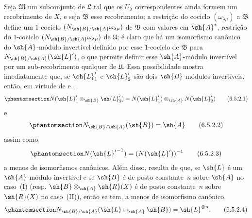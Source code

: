 \documentclass[oneside,10pt]{amsart}
\let\EGAOriginalLabel\label
\renewcommand{\label}[1]{\phantomsection\EGAOriginalLabel{#1}}
\begin{document}
\begin{env}[6.5.2]
Seja $\mathfrak{M}$ um subconjunto de $\mathfrak{L}$ tal que os $U_\lambda$ correspondentes ainda formem um recobrimento de $X$, e seja $\mathfrak{B}$ esse recobrimento;
a restrição do cociclo $(\omega_{\lambda\mu})$ a $\mathfrak{B}$ define um $1$-cociclo $(N_{\sh{B}/\sh{A}}\omega_{\lambda\mu})$ de $\mathfrak{B}$ com valores em $\sh{A}^*$, restrição do $1$-cociclo $(N_{\sh{B}/\sh{A}}\omega_{\lambda\mu})$ de $\mathfrak{U}$;
é claro que há um isomorfismo canônico do $\sh{A}$-módulo invertível definido por esse $1$-cociclo de $\mathfrak{B}$ para $N_{\sh{B}/\sh{A}}(\sh{L}')$, o que permite definir esse $\sh{A}$-módulo invertível por um sub-recobrimento qualquer de $\mathfrak{U}$.
Essa possibilidade mostra imediatamente que, se $\sh{L}'_1$ e $\sh{L}'_2$ são dois $\sh{B}$-módulos invertíveis, então, em virtude de  e ,
\[
\label{II.6.5.2.1}
  N(\sh{L}'_1\otimes_{\sh{B}}\sh{L}'_2) = N(\sh{L}'_1)\otimes_{\sh{A}}N(\sh{L}'_2)
\tag{6.5.2.1}
\]
e
\[
\label{II.6.5.2.2}
  N_{\sh{B}/\sh{A}}(\sh{B}) = \sh{A}
\tag{6.5.2.2}
\]
assim como
\[
\label{II.6.5.2.3}
  N({\sh{L}'}^{-1}) = (N(\sh{L}'))^{-1}
\tag{6.5.2.3}
\]
a menos de isomorfismos canônicos.
Além disso, resulta de  que, se $\sh{L}$ é um $\sh{A}$-módulo invertível e se $\sh{B}$ é de posto constante~$n$ sobre $\sh{A}$ no caso~(I) (resp. $\sh{B}\otimes_{\sh{A}}\sh{R}(X)$ é de posto constante~$n$ sobre $\sh{R}(X)$ no caso~(II)), então se tem, a menos de isomorfismo canônico,
\[
\label{II.6.5.2.4}
  N_{\sh{B}/\sh{A}}(\sh{L}\otimes_{\sh{A}}\sh{B}) = \sh{L}^{\otimes n}.
\tag{6.5.2.4}
\]
\end{env}
\end{document}
